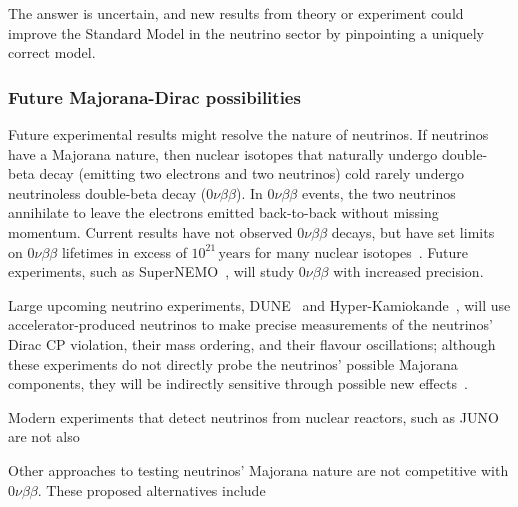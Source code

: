 The answer is uncertain, and new results from theory or experiment could
improve the Standard Model in the neutrino sector
by pinpointing a uniquely correct model.

\subsubsection{Future Majorana-Dirac possibilities}
Future experimental results might resolve the nature of neutrinos.
If neutrinos have a Majorana nature, then nuclear isotopes that naturally
undergo double-beta decay (emitting two electrons and two neutrinos)
cold rarely undergo neutrinoless double-beta decay ($0\nu\beta\beta$).
In $0\nu\beta\beta$ events, the two neutrinos annihilate to leave the electrons
emitted back-to-back without missing momentum.
Current results have not observed $0\nu\beta\beta$ decays, but have set limits
on $0\nu\beta\beta$ lifetimes in excess of $10^{21}\,\mathrm{years}$
for many nuclear isotopes~\cite{Bilenky:2014uka}.
Future experiments, such as SuperNEMO~\cite{Barabash:2011row},
will study $0\nu\beta\beta$ with increased precision.

Large upcoming neutrino experiments,
DUNE~\cite{DUNE:2016hlj} and
Hyper-Kamiokande~\cite{Hyper-Kamiokande:2018ofw},
will use accelerator-produced neutrinos to make precise measurements of the
neutrinos' Dirac CP violation,
their mass ordering, and their flavour oscillations;
although these experiments do not directly probe the neutrinos' possible
Majorana components, they will be indirectly sensitive through possible new
effects~\cite{Carrasco-Martinez:2020mlg}.

Modern experiments that detect neutrinos from nuclear reactors,
such as JUNO %
are not also

Other approaches to testing neutrinos' Majorana nature are not competitive with
$0\nu\beta\beta$. These proposed alternatives include \TODO{}


